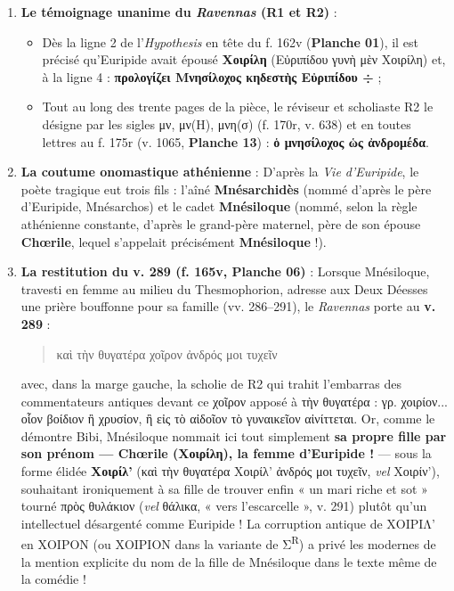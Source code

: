 \documentclass[11pt, a4paper, twoside]{article}
\renewcommand{\_}{\origunderscore\penalty0\relax}
\renewcommand{\texttt}[1]{#1}
\newcommand{\Run}{\textbf{R}\textsuperscript{1}}
\newcommand{\Rdeux}{\textbf{R}\textsuperscript{2}}
\newcommand{\Bibi}{\textit{Bibi}}
\newcommand{\auDessus}[2]{\ensuremath{\overset{\text{#2}}{\text{#1}}}}
\def\Run{R1}%
\def\Rdeux{R2}%
\def\Bibi{Bibi}%
\def\auDessus#1#2{#1(#2)}%
\begin{document}
\begin{enumerate}[leftmargin=1.6em, itemsep=2pt]
  \item \textbf{Le témoignage unanime du \textit{Ravennas} (\Run{} et \Rdeux{})} :
  \begin{itemize}[leftmargin=1.5em, itemsep=2pt]
    \item Dès la ligne 2 de l'\textit{Hypothesis} en tête du \texttt{f. 162v} (\textbf{Planche 01}), il est précisé qu'Euripide avait épousé \textbf{\texttt{Χοιρίλη}} (\texttt{Εὐριπίδου γυνὴ μὲν Χοιρίλη}) et, à la ligne 4 : \textbf{\texttt{προλογίζει Μνησίλοχος κηδεστὴς Εὐριπίδου ÷}} ;
    \item Tout au long des trente pages de la pièce, le réviseur et scholiaste \Rdeux{} le désigne par les sigles \texttt{μν}, \texttt{μ\auDessus{ν}{Η}}, \texttt{μν\auDessus{η}{σ}} (\texttt{f. 170r}, v. 638) et en toutes lettres au \texttt{f. 175r} (v. 1065, \textbf{Planche 13}) : \textbf{\texttt{ὁ μνησίλοχος ὡς ἀνδρομέδα}}.
  \end{itemize}
  \item \textbf{La coutume onomastique athénienne} : D'après la \textit{Vie d'Euripide}, le poète tragique eut trois fils : l'aîné \textbf{Mnésarchidès} (nommé d'après le père d'Euripide, Mnésarchos) et le cadet \textbf{Mnésiloque} (nommé, selon la règle athénienne constante, d'après le grand-père maternel, père de son épouse \textbf{Chœrile}, lequel s'appelait précisément \textbf{Mnésiloque} !).
  \item \textbf{La restitution du v. 289 (\texttt{f. 165v}, Planche 06)} : Lorsque Mnésiloque, travesti en femme au milieu du Thesmophorion, adresse aux Deux Déesses une prière bouffonne pour sa famille (\texttt{vv. 286–291}), le \textit{Ravennas} porte au \textbf{v. 289} :
  \begin{quote}
  \texttt{καὶ τὴν θυγατέρα χοῖρον ἀνδρός μοι τυχεῖν}\\
  \end{quote}
  avec, dans la marge gauche, la scholie de \Rdeux{} qui trahit l'embarras des commentateurs antiques devant ce \texttt{χοῖρον} apposé à \texttt{τὴν θυγατέρα} : \texttt{γρ. χοιρίον... οἷον βοίδιον ἢ χρυσίον, ἢ εἰς τὸ αἰδοῖον τὸ γυναικεῖον αἰνίττεται}.
  Or, comme le démontre \Bibi{}, Mnésiloque nommait ici tout simplement \textbf{sa propre fille par son prénom — Chœrile (\texttt{Χοιρίλη}), la femme d'Euripide !} — sous la forme élidée \textbf{\texttt{Χοιρίλ'}} (\texttt{καὶ τὴν θυγατέρα Χοιρίλ' ἀνδρός μοι τυχεῖν}, \textit{vel} \texttt{Χοιρίν'}), souhaitant ironiquement à sa fille de trouver enfin « un mari riche et sot » tourné \texttt{πρὸς θυλάκιον} (\textit{vel} \texttt{θάλικα}, « vers l'escarcelle », v. 291) plutôt qu'un intellectuel désargenté comme Euripide ! La corruption antique de \texttt{ΧΟΙΡΙΛ'} en \texttt{ΧΟΙΡΟΝ} (ou \texttt{ΧΟΙΡΙΟΝ} dans la variante de Σ\textsuperscript{R}) a privé les modernes de la mention explicite du nom de la fille de Mnésiloque dans le texte même de la comédie !
\end{enumerate}
\end{document}
